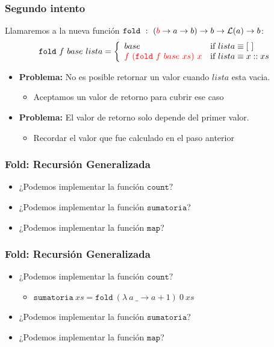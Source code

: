 \documentclass{beamer}
\begin{document}
\begin{frame}
    \frametitle{Segundo intento}
    Llamaremos a la nueva funci\'on $\mathtt{fold}\ :\ ({\color{red} b}\rightarrow a\rightarrow b)\rightarrow
        b \rightarrow \mathcal{L}(a)\rightarrow b$:
    $$
    \mathtt{fold}\ f\ base\ lista=\left\{
        \begin{array}{ll}
            base & \mbox{if }lista\equiv [\ ] \\
            {\color{red} f\ (\mathtt{fold}\ f\ base\ xs)\ x} & \mbox{if }lista\equiv x::xs
        \end{array}
    \right.
    $$
    \begin{itemize}
        \item{{\bf Problema: }No es posible retornar un valor cuando $lista$ esta vacia.
        \begin{itemize}
            \item{Aceptamos un valor de retorno para cubrir ese caso}
        \end{itemize}
        }
        \item{{\bf Problema: }El valor de retorno solo depende del primer valor.
            \begin{itemize}
                \item{Recordar el valor que fue calculado en el paso anterior}
            \end{itemize}
        }
    \end{itemize}
\end{frame}

\begin{frame}
    \frametitle{Fold: Recursi\'on Generalizada}
    \begin{itemize}
        \item{¿Podemos implementar la funci\'on $\mathtt{count}?$}
        \item{¿Podemos implementar la funci\'on $\mathtt{sumatoria}$?}
        \item{¿Podemos implementar la funci\'on $\mathtt{map}$?}
    \end{itemize}
    
\end{frame}

\begin{frame}
    \frametitle{Fold: Recursi\'on Generalizada}
    \begin{itemize}
        \item{¿Podemos implementar la funci\'on $\mathtt{count}?$
            \begin{itemize}
                \item{$\mathtt{sumatoria}\ xs=\mathtt{fold}\ (\lambda\ a\ \_\rightarrow a+1)
                    \ 0\ xs$}
            \end{itemize}
        }
        \item{¿Podemos implementar la funci\'on $\mathtt{sumatoria}$?}
        \item{¿Podemos implementar la funci\'on $\mathtt{map}$?}
    \end{itemize}
    
\end{frame}
\end{document}
